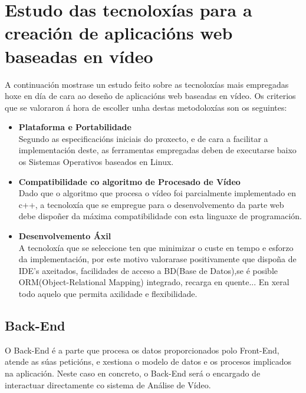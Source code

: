 \chapter{Estudo das tecnoloxías para a creación de aplicacións web baseadas en vídeo}

	A continuación mostrase un estudo feito sobre as tecnoloxías mais empregadas hoxe en día
	de cara ao deseño de aplicacións web baseadas en vídeo. Os criterios que se valoraron á
	hora de escoller unha destas metodoloxías son os seguintes:

\begin{itemize}

	\item {\textbf{Plataforma e Portabilidade\\}}
		Segundo as especificacións iniciais do proxecto, e de cara a facilitar a 
		implementación deste, as ferramentas empregadas deben de executarse baixo os
		Sistemas Operativos baseados en Linux.

	\item {\textbf{Compatibilidade co algoritmo de Procesado de Vídeo\\}}
		Dado que o algoritmo que procesa o vídeo foi parcialmente implementado en c++,
		a tecnoloxía que se empregue para o desenvolvemento da parte web debe dispoñer da
		máxima compatibilidade con esta linguaxe de programación.

	\item {\textbf{Desenvolvemento Áxil\\}}
		A tecnoloxía que se seleccione ten que minimizar o custe en tempo e esforzo da 
		implementación, por este motivo valorarase positivamente que dispoña de IDE's axeitados,
		facilidades de acceso a BD(Base de Datos),se é posible ORM(Object-Relational Mapping) 
		integrado, recarga en quente... En xeral todo aquelo que permita axilidade e flexibilidade.

\end{itemize}

\section{Back-End}
	O Back-End é a parte que procesa os datos proporcionados polo Front-End, atende as súas 
	peticións, e xestiona o modelo de datos e os procesos implicados na aplicación. Neste
	caso en concreto, o Back-End será o encargado de interactuar directamente co sistema de
	Análise de Vídeo.\\
	
